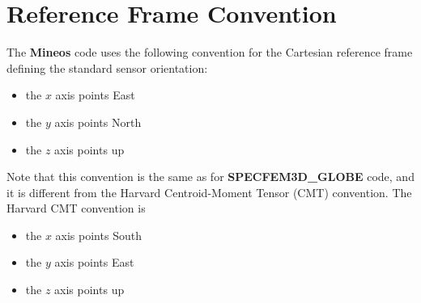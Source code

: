 \section {Reference Frame Convention}
The {\bf Mineos} code uses the following convention for the Cartesian reference frame defining the standard sensor orientation:
\begin{itemize}
\item the $x$ axis points East
\item the $y$ axis points North
\item the $z$ axis points up
\end{itemize}
Note that this convention is the same as for {\bf SPECFEM3D\_GLOBE} code, and it is
different from the Harvard Centroid-Moment Tensor 
(CMT) convention. The Harvard CMT convention is
\begin{itemize}
\item the $x$ axis points South
\item the $y$ axis points East
\item the $z$ axis points up
\end{itemize}
